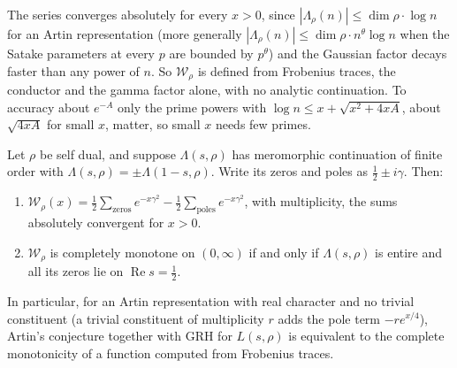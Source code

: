 The series converges absolutely for every $x>0$, since $|\Lambda_\rho(n)|\le\dim\rho\cdot\log n$ for an Artin representation (more generally $|\Lambda_\rho(n)|\le\dim\rho\cdot n^{\theta}\log n$ when the Satake parameters at every $p$ are bounded by $p^{\theta}$) and the Gaussian factor decays faster than any power of $n$. So $\mathcal W_\rho$ is defined from Frobenius traces, the conductor and the gamma factor alone, with no analytic continuation. To accuracy about $e^{-A}$ only the prime powers with $\log n\le x+\sqrt{x^2+4xA}$, about $\sqrt{4xA}$ for small $x$, matter, so small $x$ needs few primes.

\begin{theorem}\label{thm:recipcm}
Let $\rho$ be self dual, and suppose $\Lambda(s,\rho)$ has meromorphic continuation of finite order with $\Lambda(s,\rho)=\pm\Lambda(1-s,\rho)$. Write its zeros and poles as $\frac12\pm i\gamma$. Then:
\begin{enumerate}
\item[(i)] $\mathcal W_\rho(x)=\frac12\sum_{\text{zeros}}e^{-x\gamma^2}-\frac12\sum_{\text{poles}}e^{-x\gamma^2}$, with multiplicity, the sums absolutely convergent for $x>0$.
\item[(ii)] $\mathcal W_\rho$ is completely monotone on $(0,\infty)$ if and only if $\Lambda(s,\rho)$ is entire and all its zeros lie on $\operatorname{Re}s=\frac12$.
\end{enumerate}
In particular, for an Artin representation with real character and no trivial constituent (a trivial constituent of multiplicity $r$ adds the pole term $-re^{x/4}$), Artin's conjecture together with GRH for $L(s,\rho)$ is equivalent to the complete monotonicity of a function computed from Frobenius traces.
\end{theorem}

